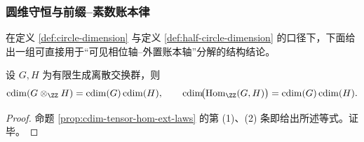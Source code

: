 \subsubsection{圆维守恒与前缀--素数账本律}\label{subsubsec:cdim-prefix-prime-ledger-laws}
在定义 \ref{def:circle-dimension} 与定义 \ref{def:half-circle-dimension} 的口径下，下面给出一组可直接用于“可见相位轴--外置账本轴”分解的结构结论。

\begin{proposition}\label{prop:cdim-tensor-hom-product-law-restated}
设 \(G,H\) 为有限生成离散交换群，则
\[
\cdim(G\otimes_{\ZZ}H)=\cdim(G)\cdim(H),\qquad
\cdim\!\bigl(\operatorname{Hom}_{\ZZ}(G,H)\bigr)=\cdim(G)\cdim(H).
\]
\end{proposition}
\begin{proof}
命题 \ref{prop:cdim-tensor-hom-ext-laws} 的第 (1)、(2) 条即给出所述等式。证毕。
\end{proof}

